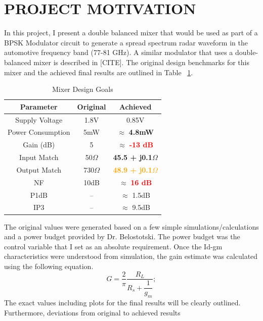 \documentclass{article}                                                         %
\begin{document}
\section{PROJECT MOTIVATION}
In this project, I present a double balanced mixer that would be used as part of a  BPSK Modulator circuit
to generate a spread spectrum radar waveform in the automotive frequency band (77-81 GHz). A similar modulator
that uses a double-balanced mixer is described in [CITE]. The original design benchmarks for this mixer
and the achieved final results are outlined in Table ~\ref{table:goalsnresults}.\vspace{3mm}
\vspace{3mm}
\begin{table}[H]
\centering
 \begin{tabular}{ | c | c | c |}
   \hline
    \textbf{Parameter} & \textbf{Original} & \textbf{Achieved}  \\
    \hline
    \hline
    Supply Voltage & 1.8V & 0.85V \\
    \hline
    Power Consumption & 5mW & $\approx$ \textbf{\textcolor{OliveGreen}{4.8mW}}\\
    \hline
    Gain (dB)   & 5 & $\approx$ \textbf{\textcolor{Red}{-13 dB}} \\
    \hline
    Input Match  & 50$\Omega$ & \textbf{\textcolor{OliveGreen}{45.5 + j0.1$\Omega$}} \\
    \hline
    Output Match & 730$\Omega$ & \textbf{\textcolor{Orange}{48.9 + j0.1$\Omega$}}\\
    \hline
    NF & 10dB & $\approx$ \textbf{\textcolor{Red}{16 dB}}\\
    \hline
    P1dB & -- & $\approx$ 1.5dB  \\
    \hline
    IP3 & -- & $\approx$ 9.5dB  \\
    \hline
  \end{tabular}
  \caption{Mixer Design Goals}
  \label{table:goalsnresults}
\end{table}
The original values were generated based on a few simple simulations/calculations and a power budget provided by Dr. Belostotski. The
power budget was the control variable that I set as an absolute requirement.  Once the Id-gm
characteristics were understood from simulation, the gain estimate was calculated using the following equation.
\begin{equation}
  \label{eq:idealgain}
  G=\dfrac{2}{\pi}\dfrac{R_L}{R_s + \dfrac{1}{g_m}};
\end{equation}
The exact values including plots for the final results will be clearly outlined. Furthermore, deviations from original to achieved results
\end{document}
